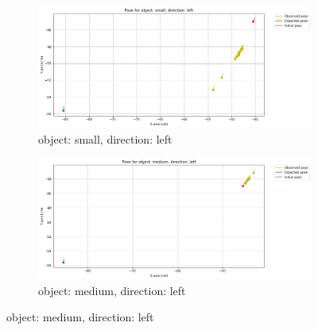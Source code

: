 \documentclass[10pt,a4paper]{article}
\begin{document}
\begin{itemize}
								\begin{figure}[H]
									\begin{subfigure}{0.5\textwidth}
										\centering
										\includegraphics[width=0.8\linewidth]{img/pose_small_left.png}
										\caption{object: small, direction: left}
										\label{fig:object: small, direction: left}
									\end{subfigure}%
									\begin{subfigure}{0.5\textwidth}
										\centering
										\includegraphics[width=0.8\linewidth]{img/pose_medium_left.png}
										\caption{object: medium, direction: left}
										\label{fig:object: medium, direction: left}
									\end{subfigure}
									

\end{figure}
\end{itemize}
\end{document}
